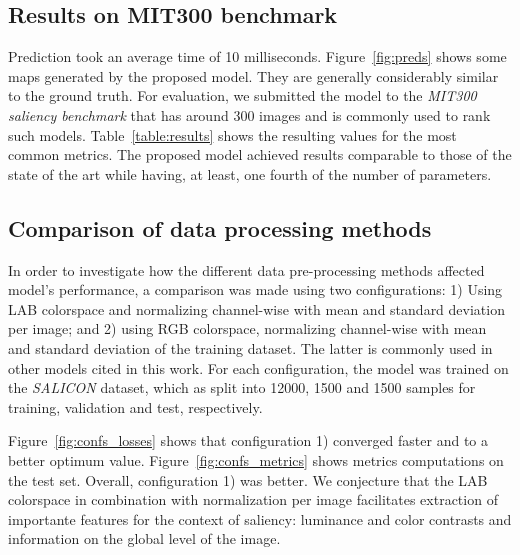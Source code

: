 \documentclass[10pt,twocolumn,letterpaper]{article}
\begin{document}
\subsection{Results on MIT300 benchmark}
Prediction took an average time of 10 milliseconds.
Figure~\ref{fig:preds} shows some maps generated by the proposed model.
They are generally considerably similar to the ground truth. For evaluation, we submitted the model to the \emph{MIT300 saliency benchmark} that has around 300 images and is commonly used to rank such models. Table~\ref{table:results} shows the resulting values for the most common metrics.
The proposed model achieved results comparable to those of the state of the art while having, at least, one fourth of the number of parameters.

\subsection{Comparison of data processing methods}
\label{sec:dataproc_compar}
In order to investigate how the different data pre-processing methods
affected model's performance, a comparison was made using two configurations:
1) Using LAB colorspace and normalizing channel-wise with mean and standard
deviation per image; and 2) using RGB colorspace, normalizing channel-wise
with mean and standard deviation of the training dataset.
The latter is commonly used in other models cited in this work.
For each configuration, the model was trained on the
\emph{SALICON} dataset, which as split into
12000, 1500 and 1500 samples for training, validation and test, respectively.

Figure~\ref{fig:confs_losses} shows that configuration 1) converged faster
and to a better optimum value.
Figure~\ref{fig:confs_metrics} shows metrics computations on the test set.
Overall, configuration 1) was better.
We conjecture that the LAB colorspace in combination with normalization per
image facilitates extraction of importante features for the context
of saliency: luminance and color contrasts and information on the global level
of the image.
\end{document}
